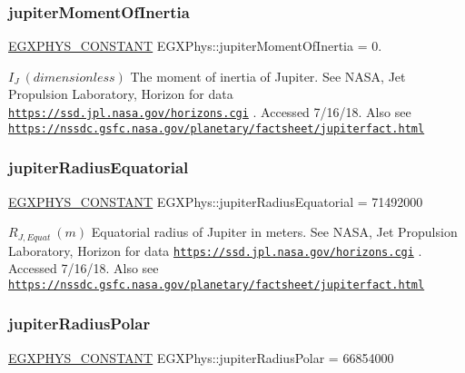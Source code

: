 \subsubsection{\texorpdfstring{jupiter\+Moment\+Of\+Inertia}{jupiterMomentOfInertia}}
{\footnotesize\ttfamily \mbox{\hyperlink{group___e_g_x_phys-_constants-_macros_ga76980d288494ce1714c9ac68a95ba702}{E\+G\+X\+P\+H\+Y\+S\+\_\+\+C\+O\+N\+S\+T\+A\+NT}} E\+G\+X\+Phys\+::jupiter\+Moment\+Of\+Inertia = 0.}

$ I_{J} \ (dimensionless)$ The moment of inertia of Jupiter. See N\+A\+SA, Jet Propulsion Laboratory, Horizon for data \href{https://ssd.jpl.nasa.gov/horizons.cgi}{\tt https\+://ssd.\+jpl.\+nasa.\+gov/horizons.\+cgi} . Accessed 7/16/18. Also see \href{https://nssdc.gsfc.nasa.gov/planetary/factsheet/jupiterfact.html}{\tt https\+://nssdc.\+gsfc.\+nasa.\+gov/planetary/factsheet/jupiterfact.\+html} \mbox{\label{group___e_g_x_phys-_constants-_astrophysics-_solar_system-_jupiter-_bulk_gae10498fbbb0666a828130575ffc28d6e}} 
\subsubsection{\texorpdfstring{jupiter\+Radius\+Equatorial}{jupiterRadiusEquatorial}}
{\footnotesize\ttfamily \mbox{\hyperlink{group___e_g_x_phys-_constants-_macros_ga76980d288494ce1714c9ac68a95ba702}{E\+G\+X\+P\+H\+Y\+S\+\_\+\+C\+O\+N\+S\+T\+A\+NT}} E\+G\+X\+Phys\+::jupiter\+Radius\+Equatorial = 71492000}

$R_{J,Equat} \ (m)$ Equatorial radius of Jupiter in meters. See N\+A\+SA, Jet Propulsion Laboratory, Horizon for data \href{https://ssd.jpl.nasa.gov/horizons.cgi}{\tt https\+://ssd.\+jpl.\+nasa.\+gov/horizons.\+cgi} . Accessed 7/16/18. Also see \href{https://nssdc.gsfc.nasa.gov/planetary/factsheet/jupiterfact.html}{\tt https\+://nssdc.\+gsfc.\+nasa.\+gov/planetary/factsheet/jupiterfact.\+html} \mbox{\label{group___e_g_x_phys-_constants-_astrophysics-_solar_system-_jupiter-_bulk_ga7b2626988078bb3648e4a4238b36c825}} 
\subsubsection{\texorpdfstring{jupiter\+Radius\+Polar}{jupiterRadiusPolar}}
{\footnotesize\ttfamily \mbox{\hyperlink{group___e_g_x_phys-_constants-_macros_ga76980d288494ce1714c9ac68a95ba702}{E\+G\+X\+P\+H\+Y\+S\+\_\+\+C\+O\+N\+S\+T\+A\+NT}} E\+G\+X\+Phys\+::jupiter\+Radius\+Polar = 66854000}

